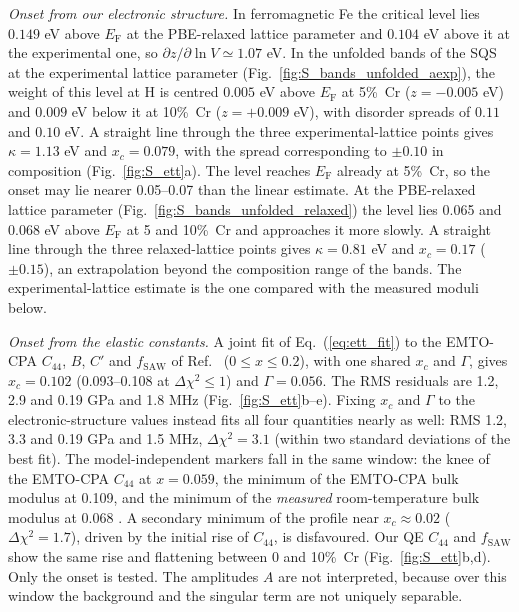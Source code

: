 \documentclass[final,3p,times]{elsarticle}
\begin{document}
\textit{Onset from our electronic structure.} In ferromagnetic Fe the critical level lies $0.149$ eV above $E_{\mathrm F}$ at the PBE-relaxed lattice parameter and $0.104$ eV above it at the experimental one, so $\partial z/\partial\ln V\simeq1.07$ eV. In the unfolded bands of the SQS at the experimental lattice parameter (Fig.~\ref{fig:S_bands_unfolded_aexp}), the weight of this level at H is centred $0.005$ eV above $E_{\mathrm F}$ at 5\%~Cr ($z=-0.005$ eV) and $0.009$ eV below it at 10\%~Cr ($z=+0.009$ eV), with disorder spreads of $0.11$ and $0.10$ eV. A straight line through the three experimental-lattice points gives $\kappa=1.13$ eV and $x_c=0.079$, with the spread corresponding to $\pm0.10$ in composition (Fig.~\ref{fig:S_ett}a). The level reaches $E_{\mathrm F}$ already at 5\%~Cr, so the onset may lie nearer 0.05--0.07 than the linear estimate. At the PBE-relaxed lattice parameter (Fig.~\ref{fig:S_bands_unfolded_relaxed}) the level lies 0.065 and 0.068 eV above $E_{\mathrm F}$ at 5 and 10\%~Cr and approaches it more slowly. A straight line through the three relaxed-lattice points gives $\kappa=0.81$ eV and $x_c=0.17$ ($\pm0.15$), an extrapolation beyond the composition range of the bands. The experimental-lattice estimate is the one compared with the measured moduli below.

\textit{Onset from the elastic constants.} A joint fit of Eq.~(\ref{eq:ett_fit}) to the EMTO-CPA $C_{44}$, $B$, $C'$ and $f_{\mathrm{SAW}}$ of Ref.~\cite{razumovskiy2011first} ($0\le x\le0.2$), with one shared $x_c$ and $\Gamma$, gives $x_c=0.102$ (0.093--0.108 at $\Delta\chi^2\le1$) and $\Gamma=0.056$. The RMS residuals are 1.2, 2.9 and 0.19 GPa and 1.8 MHz (Fig.~\ref{fig:S_ett}b--e). Fixing $x_c$ and $\Gamma$ to the electronic-structure values instead fits all four quantities nearly as well: RMS 1.2, 3.3 and 0.19 GPa and 1.5 MHz, $\Delta\chi^2=3.1$ (within two standard deviations of the best fit). The model-independent markers fall in the same window: the knee of the EMTO-CPA $C_{44}$ at $x=0.059$, the minimum of the EMTO-CPA bulk modulus at 0.109, and the minimum of the \emph{measured} room-temperature bulk modulus at 0.068 \cite{korzhavyi2009electronic}. A secondary minimum of the profile near $x_c\approx0.02$ ($\Delta\chi^2=1.7$), driven by the initial rise of $C_{44}$, is disfavoured. Our QE $C_{44}$ and $f_{\mathrm{SAW}}$ show the same rise and flattening between 0 and 10\%~Cr (Fig.~\ref{fig:S_ett}b,d). Only the onset is tested. The amplitudes $A$ are not interpreted, because over this window the background and the singular term are not uniquely separable.
\end{document}
